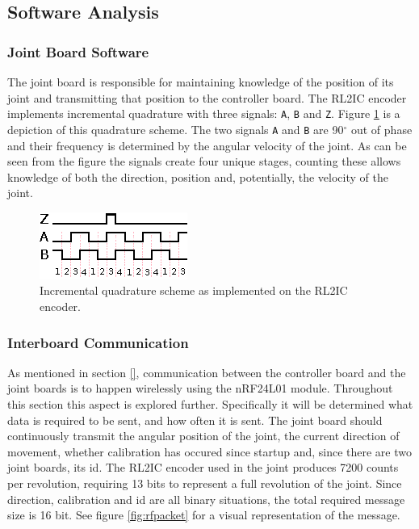 \subsection{Software Analysis} %
\label{sub:software_analysis}

\subsubsection{Joint Board Software} %
\label{ssub:joint_board_software}
The joint board is responsible for maintaining knowledge of the position of its joint and transmitting that position to the controller board.
The RL2IC encoder implements incremental quadrature with three signals: \texttt{A}, \texttt{B} and \texttt{Z}.
Figure \ref{fig:quadrature} is a depiction of this quadrature scheme.
The two signals \texttt{A} and \texttt{B} are 90$^\circ$ out of phase and their frequency is determined by the angular velocity of the joint.
As can be seen from the figure the signals create four unique stages, counting these allows knowledge of both the direction, position and, potentially, the velocity of the joint.

\begin{figure}[h]
	\centering
	\includegraphics[width=.5\linewidth]{graphics/quadrature}
	\caption{Incremental quadrature scheme as implemented on the RL2IC encoder.}
	\label{fig:quadrature}
\end{figure}

\subsubsection{Interboard Communication} %
\label{ssub:interboard_communication}
As mentioned in section \ref{}, communication between the controller board and the joint boards is to happen wirelessly using the nRF24L01 module.
Throughout this section this aspect is explored further.
Specifically it will be determined what data is required to be sent, and how often it is sent.
The joint board should continuously transmit the angular position of the joint, the current direction of movement, whether calibration has occured since startup and, since there are two joint boards, its id.
The RL2IC encoder used in the joint produces 7200 counts per revolution, requiring 13 bits to represent a full revolution of the joint.
Since direction, calibration and id are all binary situations, the total required message size is 16 bit.
See figure \ref{fig:rfpacket} for a visual representation of the message.

